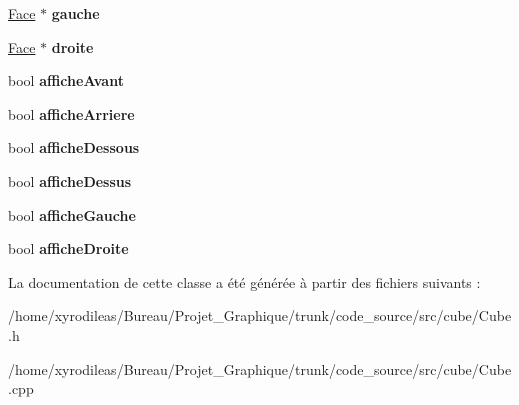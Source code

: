 \begin{DoxyCompactItemize}
\item 
\hypertarget{classCube_a20f3cdf33801cd347159274dfe15309e}{\hyperlink{classFace}{Face} $\ast$ {\bfseries gauche}}\label{classCube_a20f3cdf33801cd347159274dfe15309e}

\item 
\hypertarget{classCube_a9c1fcb84ad9d36212e381a2ac106726d}{\hyperlink{classFace}{Face} $\ast$ {\bfseries droite}}\label{classCube_a9c1fcb84ad9d36212e381a2ac106726d}

\item 
\hypertarget{classCube_a9da9d67b27b32955b66d2c6c92eae794}{bool {\bfseries affiche\-Avant}}\label{classCube_a9da9d67b27b32955b66d2c6c92eae794}

\item 
\hypertarget{classCube_a30e384bb71aa9b3ebc25c03bef785815}{bool {\bfseries affiche\-Arriere}}\label{classCube_a30e384bb71aa9b3ebc25c03bef785815}

\item 
\hypertarget{classCube_a39fa6217cd00765fe3f14c46fee39f28}{bool {\bfseries affiche\-Dessous}}\label{classCube_a39fa6217cd00765fe3f14c46fee39f28}

\item 
\hypertarget{classCube_aef7d564ad9783a84b17226e99c88f06c}{bool {\bfseries affiche\-Dessus}}\label{classCube_aef7d564ad9783a84b17226e99c88f06c}

\item 
\hypertarget{classCube_ad7012c8e174b39e23de36f78e73e0f95}{bool {\bfseries affiche\-Gauche}}\label{classCube_ad7012c8e174b39e23de36f78e73e0f95}

\item 
\hypertarget{classCube_aa98904d1d3f776620b50a3608d6da818}{bool {\bfseries affiche\-Droite}}\label{classCube_aa98904d1d3f776620b50a3608d6da818}

\end{DoxyCompactItemize}


La documentation de cette classe a été générée à partir des fichiers suivants \-:\begin{DoxyCompactItemize}
\item 
/home/xyrodileas/\-Bureau/\-Projet\-\_\-\-Graphique/trunk/code\-\_\-source/src/cube/Cube.\-h\item 
/home/xyrodileas/\-Bureau/\-Projet\-\_\-\-Graphique/trunk/code\-\_\-source/src/cube/Cube.\-cpp\end{DoxyCompactItemize}
